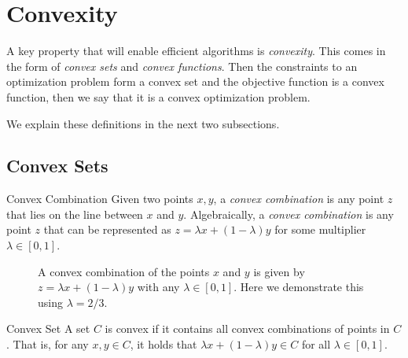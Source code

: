 
\section{Convexity}
A key property that will enable efficient algorithms is \emph{convexity}.  This comes in the form of \emph{convex sets} and \emph{convex functions}.  Then the constraints to an optimization problem form a  convex set and the objective function is a convex function, then we say that it is a convex optimization problem.

We explain these definitions in the next two subsections.
\subsection{Convex Sets}

\begin{definition}{Convex Combination}{}
Given two points $x,y$, a \emph{convex combination} is any point $z$ that lies on the line between $x$ and $y$.  Algebraically, a \emph{convex combination} is any point $z$ that can be represented as $z = \lambda x + (	1-\lambda) y $ for some multiplier $\lambda \in [0,1]$.
\end{definition}

\begin{figure}[h]
\begin{center}
\end{center}
\caption{A convex combination of the points $x$ and $y$ is given by $z = \lambda x + (1-\lambda)y$ with any $\lambda \in [0,1]$.  Here we demonstrate this using $\lambda = 2/3$.  }
\end{figure}



\begin{definition}{Convex Set}{}
A set $C$ is convex if it contains all convex combinations of points in $C$.  That is, for any $x,y \in C$, it holds that $ \lambda x + (1-\lambda) y \in C$ for all $\lambda \in [0,1]$.
\end{definition}


